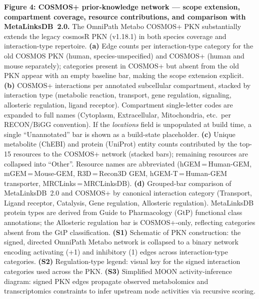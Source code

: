 \textbf{Figure 4: COSMOS+ prior-knowledge network --- scope extension, compartment coverage, resource contributions, and comparison with MetaLinksDB~2.0.}
The OmniPath Metabo COSMOS+ PKN substantially extends the legacy cosmosR PKN (v1.18.1) in both species coverage and interaction-type repertoire.
\textbf{(a)} Edge counts per interaction-type category for the old COSMOS PKN (human, species-unspecified) and COSMOS+ (human and mouse separately); categories present in COSMOS+ but absent from the old PKN appear with an empty baseline bar, making the scope extension explicit.
\textbf{(b)} COSMOS+ interactions per annotated subcellular compartment, stacked by interaction type (metabolic reaction, transport, gene regulation, signaling, allosteric regulation, ligand receptor). Compartment single-letter codes are expanded to full names (Cytoplasm, Extracellular, Mitochondria, etc.\ per RECON/BiGG convention). If the \textit{locations} field is unpopulated at build time, a single ``Unannotated'' bar is shown as a build-state placeholder.
\textbf{(c)} Unique metabolite (ChEBI) and protein (UniProt) entity counts contributed by the top-15 resources to the COSMOS+ network (stacked bars); remaining resources are collapsed into ``Other''. Resource names are abbreviated (hGEM\,=\,Human-GEM, mGEM\,=\,Mouse-GEM, R3D\,=\,Recon3D GEM, hGEM-T\,=\,Human-GEM transporter, MRCLinks\,=\,MRCLinksDB).
\textbf{(d)} Grouped-bar comparison of MetaLinksDB~2.0 and COSMOS+ by canonical interaction category (Transport, Ligand receptor, Catalysis, Gene regulation, Allosteric regulation). MetaLinksDB protein types are derived from Guide to Pharmacology (GtP) functional class annotations; the Allosteric regulation bar is COSMOS+-only, reflecting categories absent from the GtP classification.
\textbf{(S1)} Schematic of PKN construction: the signed, directed OmniPath Metabo network is collapsed to a binary network encoding activating (+1) and inhibitory (\textminus{}1) edges across interaction-type categories.
\textbf{(S2)} Regulation-type legend: visual key for the signed interaction categories used across the PKN.
\textbf{(S3)} Simplified MOON activity-inference diagram: signed PKN edges propagate observed metabolomics and transcriptomics constraints to infer upstream node activities via recursive scoring.
